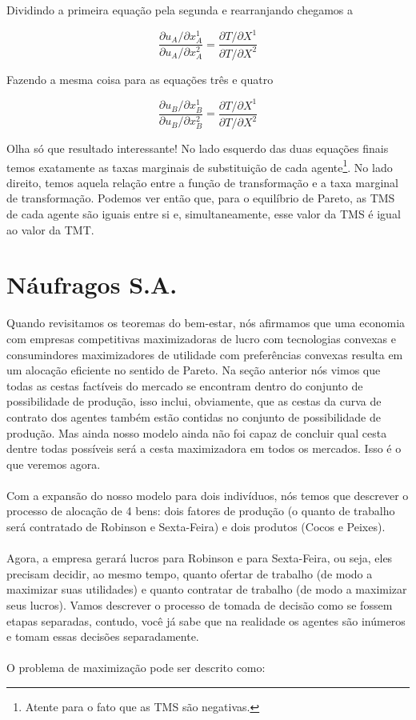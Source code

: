 \documentclass[a4paper,11pt,oneside]{book}
\theoremstyle{definition}
\theoremstyle{break}
\begin{document}
Dividindo a primeira equação pela segunda e rearranjando chegamos a

$$ \frac{\partial u_A/\partial x^1_A}{\partial u_A/\partial x^2_A} = \frac{\partial T/\partial X^1}{\partial T/\partial X^2} $$

Fazendo a mesma coisa para as equações três e quatro

$$ \frac{\partial u_B/\partial x^1_B}{\partial u_B/\partial x^2_B} = \frac{\partial T/\partial X^1}{\partial T/\partial X^2} $$

Olha só que resultado interessante! No lado esquerdo das duas equações finais temos exatamente as taxas marginais de substituição de cada agente\footnote{Atente para o fato que as TMS são negativas.}. No lado direito, temos aquela relação entre a função de transformação e a taxa marginal de transformação. Podemos ver então que, para o equilíbrio de Pareto, as TMS de cada agente são iguais entre si e, simultaneamente, esse valor da TMS é igual ao valor da TMT.

\section{Náufragos S.A.}

Quando revisitamos os teoremas do bem-estar, nós afirmamos que uma economia com empresas competitivas maximizadoras de lucro com tecnologias convexas e consumindores maximizadores de utilidade com preferências convexas resulta em um alocação eficiente no sentido de Pareto. Na seção anterior nós vimos que todas as cestas factíveis do mercado se encontram dentro do conjunto de possibilidade de produção, isso inclui, obviamente, que as cestas da curva de contrato dos agentes também estão contidas no conjunto de possibilidade de produção. Mas ainda nosso modelo ainda não foi capaz de concluir qual cesta dentre todas possíveis será a cesta maximizadora em todos os mercados. Isso é o que veremos agora.
\\
\\
Com a expansão do nosso modelo para dois indivíduos, nós temos que descrever o processo de alocação de 4 bens: dois fatores de produção (o quanto de trabalho será contratado de Robinson e Sexta-Feira) e dois produtos (Cocos e Peixes).
\\
\\
Agora, a empresa gerará lucros para Robinson e para Sexta-Feira, ou seja, eles precisam decidir, ao mesmo tempo, quanto ofertar de trabalho (de modo a maximizar suas utilidades) e quanto contratar de trabalho (de modo a  maximizar seus lucros). Vamos descrever o processo de tomada de decisão como se fossem etapas separadas, contudo, você já sabe que na realidade os agentes são inúmeros e tomam essas decisões separadamente.
\\
\\
O problema de maximização pode ser descrito como:
\end{document}
